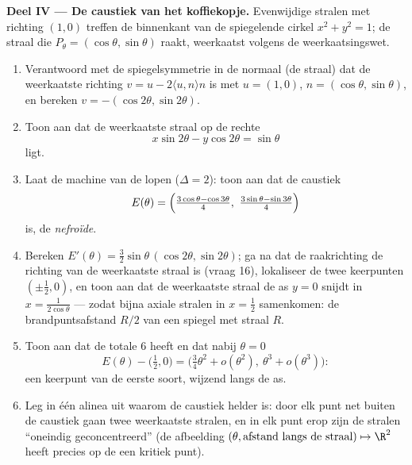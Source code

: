 \begin{problem}
\medskip
\noindent\textbf{Deel IV --- De caustiek van het koffiekopje.}
Evenwijdige stralen met richting $(1, 0)$ treffen de binnenkant van
de spiegelende cirkel $x^2 + y^2 = 1$; de straal die $P_\theta =
(\cos\theta, \sin\theta)$ raakt, weerkaatst volgens de
weerkaatsingswet.
\begin{enumerate}[resume]
  \item Verantwoord met de spiegelsymmetrie in de normaal (de
        straal) dat de weerkaatste richting $v = u - 2\langle u,
        n\rangle n$ is met $u = (1,0)$, $n = (\cos\theta,
        \sin\theta)$, en bereken $v = -(\cos2\theta,
        \sin2\theta)$.
  \item Toon aan dat de weerkaatste straal op de rechte
        \[
        x\sin 2\theta - y\cos 2\theta = \sin\theta
        \]
        ligt.
  \item Laat de machine van de  lopen ($\Delta = 2$):
        toon aan dat de caustiek
        \[
        E(\theta) = \Bigl(\tfrac{3\cos\theta -
        \cos3\theta}4,\ \tfrac{3\sin\theta -
        \sin3\theta}4\Bigr)
        \]
        is, de \emph{nefroïde}.
  \item Bereken $E'(\theta) = \tfrac32\sin\theta\,
        (\cos2\theta, \sin2\theta)$; ga na dat de raakrichting de
        richting van de weerkaatste straal is (vraag 16),
        lokaliseer de twee keerpunten $(\pm\tfrac12, 0)$, en toon
        aan dat de weerkaatste straal de as $y = 0$ snijdt in $x =
        \frac1{2\cos\theta}$ --- zodat bijna axiale stralen in $x =
        \tfrac12$ samenkomen: de brandpuntsafstand $R/2$ van een
        spiegel met straal $R$.
  \item Toon aan dat de  totale  $6$ heeft en dat
        nabij $\theta = 0$
        \[
        E(\theta) - \bigl(\tfrac12, 0\bigr) =
        \bigl(\tfrac34\theta^2 + o(\theta^2),\ \theta^3 +
        o(\theta^3)\bigr) :
        \]
        een keerpunt van de eerste soort, wijzend langs de as.
  \item Leg in één alinea uit waarom de caustiek helder is: door
        elk punt net buiten de caustiek gaan twee weerkaatste
        stralen, en in elk punt erop zijn de stralen ``oneindig
        geconcentreerd'' (de afbeelding $(\theta, \text{afstand
        langs de straal}) \mapsto \R^2$ heeft precies op de
         een kritiek punt).
\end{enumerate}


\end{problem}
